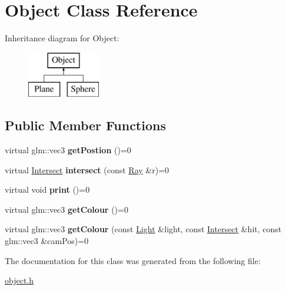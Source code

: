 \hypertarget{class_object}{}\section{Object Class Reference}
\label{class_object}
Inheritance diagram for Object\+:\begin{figure}[H]
\begin{center}
\leavevmode
\includegraphics[height=2.000000cm]{class_object}
\end{center}
\end{figure}
\subsection*{Public Member Functions}
\begin{DoxyCompactItemize}
\item 
\mbox{\label{class_object_ac29e04a255155b791d69b97820423efa}} 
virtual glm\+::vec3 {\bfseries get\+Postion} ()=0
\item 
\mbox{\label{class_object_a27b26f69f1fcb4dc72eca40ac0d20ea6}} 
virtual \mbox{\hyperlink{struct_intersect}{Intersect}} {\bfseries intersect} (const \mbox{\hyperlink{struct_ray}{Ray}} \&r)=0
\item 
\mbox{\label{class_object_ad81452e5a38455eff025d85ef1da7307}} 
virtual void {\bfseries print} ()=0
\item 
\mbox{\label{class_object_a0a966fb37be861cbaacb834ef7b89d8a}} 
virtual glm\+::vec3 {\bfseries get\+Colour} ()=0
\item 
\mbox{\label{class_object_aac162b545913d7aeab851204d3f04ebf}} 
virtual glm\+::vec3 {\bfseries get\+Colour} (const \mbox{\hyperlink{class_light}{Light}} \&light, const \mbox{\hyperlink{struct_intersect}{Intersect}} \&hit, const glm\+::vec3 \&cam\+Pos)=0
\end{DoxyCompactItemize}


The documentation for this class was generated from the following file\+:\begin{DoxyCompactItemize}
\item 
\mbox{\hyperlink{object_8h}{object.\+h}}\end{DoxyCompactItemize}
